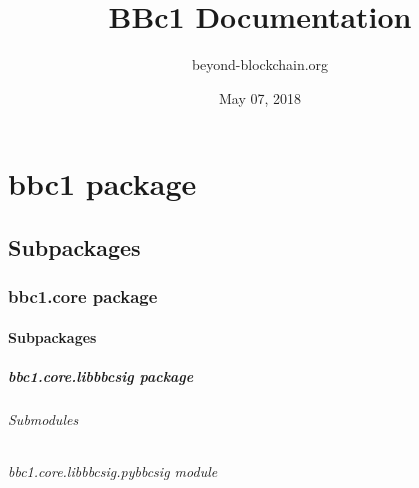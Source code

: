 \documentclass[letterpaper,10pt,english]{sphinxmanual}
\title{BBc1 Documentation}
\date{May 07, 2018}
\author{beyond-blockchain.org}
\begin{document}
\maketitle
\sphinxtableofcontents
{}\label{\detokenize{index::doc}}



\chapter{bbc1 package}
\label{\detokenize{bbc1::doc}}\label{\detokenize{bbc1:bbc1-package}}\label{\detokenize{bbc1:welcome-to-bbc1-s-documentation}}

\section{Subpackages}
\label{\detokenize{bbc1:subpackages}}

\subsection{bbc1.core package}
\label{\detokenize{bbc1.core::doc}}\label{\detokenize{bbc1.core:bbc1-core-package}}

\subsubsection{Subpackages}
\label{\detokenize{bbc1.core:subpackages}}

\paragraph{bbc1.core.libbbcsig package}
\label{\detokenize{bbc1.core.libbbcsig::doc}}\label{\detokenize{bbc1.core.libbbcsig:bbc1-core-libbbcsig-package}}

\subparagraph{Submodules}
\label{\detokenize{bbc1.core.libbbcsig:submodules}}

\subparagraph{bbc1.core.libbbcsig.pybbcsig module}
\label{\detokenize{bbc1.core.libbbcsig.pybbcsig:module-bbc1.core.libbbcsig.pybbcsig}}\label{\detokenize{bbc1.core.libbbcsig.pybbcsig::doc}}\label{\detokenize{bbc1.core.libbbcsig.pybbcsig:bbc1-core-libbbcsig-pybbcsig-module}}
\end{document}
